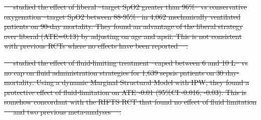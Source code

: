 \documentclass[10pt,letterpaper]{article}
\providecommand{\DIFdeltex}[1]{{\protect\color{red}\sout{#1}}}                      %
\providecommand{\DIFdelbegin}{} %
\providecommand{\DIFdelend}{} %
\providecommand{\DIFdel}[1]{\texorpdfstring{\DIFdeltex{#1}}{}} %
\newcommand{\DIFscaledelfig}{0.5}
\newlength{\DIFdelgraphicswidth} %
\newlength{\DIFdelgraphicsheight} %
\newcommand{\DIFdelincludegraphics}[2][]{%
\sbox{\DIFdelgraphicsbox}{\DIFOincludegraphics[#1]{#2}}%
\settoboxwidth{\DIFdelgraphicswidth}{\DIFdelgraphicsbox} %
\settoboxtotalheight{\DIFdelgraphicsheight}{\DIFdelgraphicsbox} %
\scalebox{\DIFscaledelfig}{%
\parbox[b]{\DIFdelgraphicswidth}{\usebox{\DIFdelgraphicsbox}\\[-\baselineskip] \rule{\DIFdelgraphicswidth}{0em}}\llap{\resizebox{\DIFdelgraphicswidth}{\DIFdelgraphicsheight}{%
\setlength{\unitlength}{\DIFdelgraphicswidth}%
\begin{picture}(1,1)%
\thicklines\linethickness{2pt} %
{\color[rgb]{1,0,0}\put(0,0){\framebox(1,1){}}}%
{\color[rgb]{1,0,0}\put(0,0){\line( 1,1){1}}}%
{\color[rgb]{1,0,0}\put(0,1){\line(1,-1){1}}}%
\end{picture}%
}\hspace*{3pt}}} %
} %
\DeclareRobustCommand{\DIFdelbegin}{\DIFOdelbegin \let\includegraphics\DIFdelincludegraphics} %
\DeclareRobustCommand{\DIFdelend}{\DIFOaddend \let\includegraphics\DIFOincludegraphics} %
\begin{document}
\DIFdelbegin %
\DIFdel{\mbox{%
    \cite{gani2023structural} }\hskip0pt%
  studied the effect of \textcolor{I}{liberal
    --target SpO2 greater than 96\%--} vs \textcolor{C}{conservative
    oxygenation --target SpO2 between 88-95\%--} in \textcolor{P}{4,062
    mechanically ventilated patients} on \textcolor{O}{90-day mortality}.
  They found an advantage of the liberal strategy over liberal
  (ATE=0.13) by adjusting on age and apsii. This is not consistent with
  previous RCTs where no effects have been reported \mbox{%
    \cite{panwar2016conservative, mackle2019conservative}}\hskip0pt%
  .
}\DIFdelend %

\DIFdelbegin %
\DIFdel{\mbox{%
    \cite{shahn2020fluid} }\hskip0pt%
  studied the effect of \textcolor{I}{fluid-limiting
    treatment --caped between 6 and 10 L--} vs \textcolor{C}{no cap on
    fluid administration} strategies for \textcolor{P}{1,639 sepsis
    patients} on \textcolor{O}{30 day-mortality}. Using a dynamic Marginal
  Structural Model with IPW, they found a protective effect of
  fluid-limitation on ATE -0.01 (95\%CI -0.016, -0.03). This is somehow
  concordant with the RIFTS RCT that found no effect of fluid limitation
  \mbox{%
    \cite{corl2019restrictive} }\hskip0pt%
  and two previous meta-analyses
  \mbox{%
    \cite{malbrain2014fluid,meyhoff2020lower}}\hskip0pt%
  .
}\DIFdelend %
\end{document}

